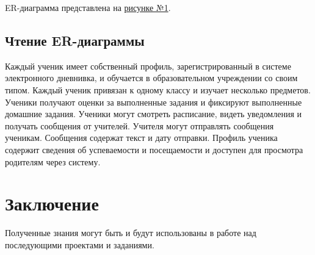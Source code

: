 \documentclass[a4paper, final]{article}
\begin{document}
ER-диаграмма представлена на \hyperlink{diag:er}{рисунке №1}.

\newpage
\hypertarget{diag:er}{}

\addtocounter{figure}{1}
\newpage

\subsection{Чтение ER-диаграммы}
Каждый ученик имеет собственный профиль, зарегистрированный в системе электронного дневнивка, и обучается в образовательном учреждении со своим типом. Каждый ученик привязан к одному классу и изучает несколько предметов. Ученики получают оценки за выполненные задания и фиксируют выполненные домашние задания. Ученики могут смотреть расписание, видеть уведомления и получать сообщения от учителей. Учителя могут отправлять сообщения ученикам. Сообщения содержат текст и дату отправки. Профиль ученика содержит сведения об успеваемости и посещаемости и доступен для просмотра родителям через систему.

\newpage
\section*{Заключение}
Полученные знания могут быть и будут использованы в работе над последующими проектами и заданиями.

\cleardoublepage
{}
\newpage
\begin{thebibliography}{0}
\end{thebibliography}
\end{document}

